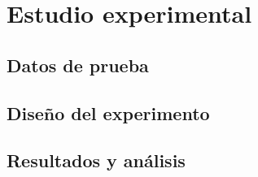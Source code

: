 \section{Estudio experimental}

\subsection{Datos de prueba}

\subsection{Diseño del experimento}

\subsection{Resultados y análisis}